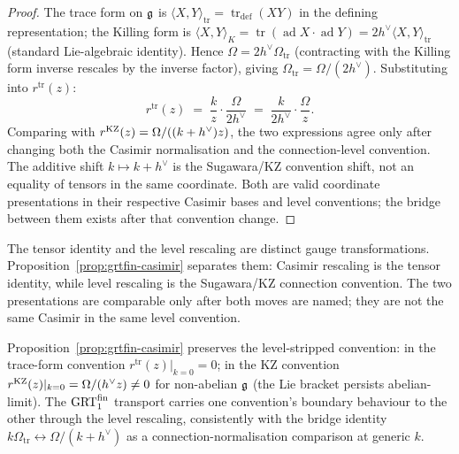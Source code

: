 \begin{proof}
The trace form on $\mathfrak{g}$ is $\langle X,Y\rangle_{\mathrm{tr}}
= \operatorname{tr}_{\mathrm{def}}(XY)$ in the defining
representation; the Killing form is
$\langle X,Y\rangle_K = \operatorname{tr}(\operatorname{ad}X\cdot
\operatorname{ad}Y) = 2h^\vee\langle X,Y\rangle_{\mathrm{tr}}$
(standard Lie-algebraic identity). Hence
$\Omega = 2h^\vee\Omega_{\mathrm{tr}}$ (contracting with the
Killing form inverse rescales by the inverse factor), giving
$\Omega_{\mathrm{tr}} = \Omega/(2h^\vee)$. Substituting into
$r^{\mathrm{tr}}(z)$:
\[
 r^{\mathrm{tr}}(z) \;=\; \frac{k}{z}\cdot\frac{\Omega}{2h^\vee}
 \;=\; \frac{k}{2h^\vee}\cdot\frac{\Omega}{z}.
\]
Comparing with $r^{\mathrm{KZ}}(z) = \Omega/((k+h^\vee)z)$, the two
expressions agree only after changing both the Casimir normalisation
and the connection-level convention. The additive shift
$k\mapsto k+h^\vee$ is the Sugawara/KZ convention shift, not an
equality of tensors in the same coordinate. Both are valid coordinate
presentations in their respective Casimir bases and level conventions;
the bridge between them exists after that convention
change.
\end{proof}

\begin{remark}
The tensor identity and the level rescaling are distinct gauge
transformations. Proposition~\ref{prop:grtfin-casimir} separates them:
Casimir rescaling is the tensor identity, while level rescaling is the
Sugawara/KZ connection convention. The two presentations are comparable
only after both moves are named; they are not the same Casimir in the
same level convention.
\end{remark}

\begin{remark}
Proposition~\ref{prop:grtfin-casimir} preserves the level-stripped convention: in the
trace-form convention $r^{\mathrm{tr}}(z)|_{k=0}=0$; in the KZ
convention $r^{\mathrm{KZ}}(z)|_{k=0} = \Omega/(h^\vee z)\neq 0$ for
non-abelian $\mathfrak{g}$ (the Lie bracket persists abelian-limit). The
$\mathrm{GRT}_1^{\mathrm{fin}}$ transport carries one convention's boundary
behaviour to the other through the level rescaling, consistently
with the bridge identity
$k\Omega_{\mathrm{tr}} \leftrightarrow \Omega/(k+h^\vee)$ as a
connection-normalisation comparison at generic $k$.
\end{remark}

